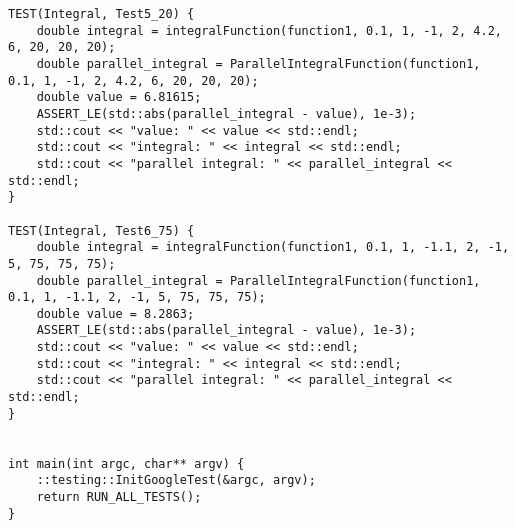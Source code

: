 \documentclass{report}
\begin{document}
\begin{lstlisting}
TEST(Integral, Test5_20) {
    double integral = integralFunction(function1, 0.1, 1, -1, 2, 4.2, 6, 20, 20, 20);
    double parallel_integral = ParallelIntegralFunction(function1, 0.1, 1, -1, 2, 4.2, 6, 20, 20, 20);
    double value = 6.81615;
    ASSERT_LE(std::abs(parallel_integral - value), 1e-3);
    std::cout << "value: " << value << std::endl;
    std::cout << "integral: " << integral << std::endl;
    std::cout << "parallel integral: " << parallel_integral << std::endl;
}

TEST(Integral, Test6_75) {
    double integral = integralFunction(function1, 0.1, 1, -1.1, 2, -1, 5, 75, 75, 75);
    double parallel_integral = ParallelIntegralFunction(function1, 0.1, 1, -1.1, 2, -1, 5, 75, 75, 75);
    double value = 8.2863;
    ASSERT_LE(std::abs(parallel_integral - value), 1e-3);
    std::cout << "value: " << value << std::endl;
    std::cout << "integral: " << integral << std::endl;
    std::cout << "parallel integral: " << parallel_integral << std::endl;
}


int main(int argc, char** argv) {
    ::testing::InitGoogleTest(&argc, argv);
    return RUN_ALL_TESTS();
}

\end{lstlisting}
\end{document}
